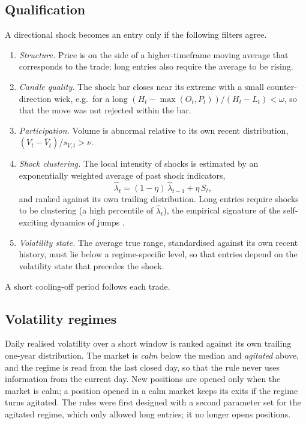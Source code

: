 \documentclass[11pt,a4paper]{article}
\newcommand{\1}{\mathbf{1}}
\begin{document}
\subsection{Qualification}

A directional shock becomes an entry only if the following filters agree.
\begin{enumerate}[label=(\alph*)]
\item \emph{Structure.} Price is on the side of a higher-timeframe moving average that corresponds to the trade; long entries also require the average to be rising.
\item \emph{Candle quality.} The shock bar closes near its extreme with a small counter-direction wick, e.g.\ for a long $(H_t-\max(O_t,P_t))/(H_t-L_t)<\omega$, so that the move was not rejected within the bar.
\item \emph{Participation.} Volume is abnormal relative to its own recent distribution, $(V_t-\bar V_t)/s_{V,t}>\nu$.
\item \emph{Shock clustering.} The local intensity of shocks is estimated by an exponentially weighted average of past shock indicators,
\begin{equation}
\hat\lambda_t=(1-\eta)\,\hat\lambda_{t-1}+\eta\,S_t,
\end{equation}
and ranked against its own trailing distribution. Long entries require shocks to be clustering (a high percentile of $\hat\lambda_t$), the empirical signature of the self-exciting dynamics of jumps \citep{Hawkes1971,AitSahaliaCachoDiazLaeven2015}.
\item \emph{Volatility state.} The average true range, standardised against its own recent history, must lie below a regime-specific level, so that entries depend on the volatility state that precedes the shock.
\end{enumerate}
A short cooling-off period follows each trade.

\subsection{Volatility regimes}

Daily realised volatility over a short window is ranked against its own trailing one-year distribution. The market is \emph{calm} below the median and \emph{agitated} above, and the regime is read from the last closed day, so that the rule never uses information from the current day. New positions are opened only when the market is calm; a position opened in a calm market keeps its exits if the regime turns agitated. The rules were first designed with a second parameter set for the agitated regime, which only allowed long entries; it no longer opens positions.
\end{document}
